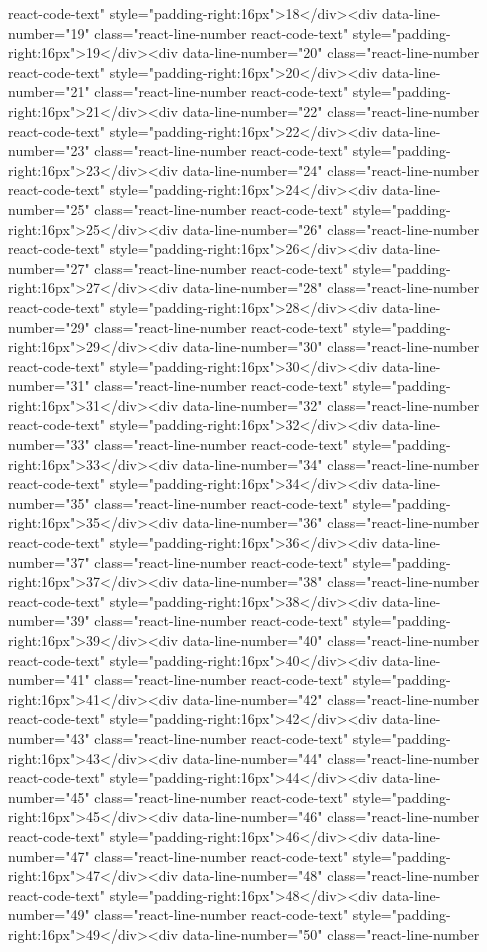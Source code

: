 {{{{{{{react-code-text" style="padding-right:16px">18</div><div data-line-number="19" class="react-line-number react-code-text" style="padding-right:16px">19</div><div data-line-number="20" class="react-line-number react-code-text" style="padding-right:16px">20</div><div data-line-number="21" class="react-line-number react-code-text" style="padding-right:16px">21</div><div data-line-number="22" class="react-line-number react-code-text" style="padding-right:16px">22</div><div data-line-number="23" class="react-line-number react-code-text" style="padding-right:16px">23</div><div data-line-number="24" class="react-line-number react-code-text" style="padding-right:16px">24</div><div data-line-number="25" class="react-line-number react-code-text" style="padding-right:16px">25</div><div data-line-number="26" class="react-line-number react-code-text" style="padding-right:16px">26</div><div data-line-number="27" class="react-line-number react-code-text" style="padding-right:16px">27</div><div data-line-number="28" class="react-line-number react-code-text" style="padding-right:16px">28</div><div data-line-number="29" class="react-line-number react-code-text" style="padding-right:16px">29</div><div data-line-number="30" class="react-line-number react-code-text" style="padding-right:16px">30</div><div data-line-number="31" class="react-line-number react-code-text" style="padding-right:16px">31</div><div data-line-number="32" class="react-line-number react-code-text" style="padding-right:16px">32</div><div data-line-number="33" class="react-line-number react-code-text" style="padding-right:16px">33</div><div data-line-number="34" class="react-line-number react-code-text" style="padding-right:16px">34</div><div data-line-number="35" class="react-line-number react-code-text" style="padding-right:16px">35</div><div data-line-number="36" class="react-line-number react-code-text" style="padding-right:16px">36</div><div data-line-number="37" class="react-line-number react-code-text" style="padding-right:16px">37</div><div data-line-number="38" class="react-line-number react-code-text" style="padding-right:16px">38</div><div data-line-number="39" class="react-line-number react-code-text" style="padding-right:16px">39</div><div data-line-number="40" class="react-line-number react-code-text" style="padding-right:16px">40</div><div data-line-number="41" class="react-line-number react-code-text" style="padding-right:16px">41</div><div data-line-number="42" class="react-line-number react-code-text" style="padding-right:16px">42</div><div data-line-number="43" class="react-line-number react-code-text" style="padding-right:16px">43</div><div data-line-number="44" class="react-line-number react-code-text" style="padding-right:16px">44</div><div data-line-number="45" class="react-line-number react-code-text" style="padding-right:16px">45</div><div data-line-number="46" class="react-line-number react-code-text" style="padding-right:16px">46</div><div data-line-number="47" class="react-line-number react-code-text" style="padding-right:16px">47</div><div data-line-number="48" class="react-line-number react-code-text" style="padding-right:16px">48</div><div data-line-number="49" class="react-line-number react-code-text" style="padding-right:16px">49</div><div data-line-number="50" class="react-line-number }}}}}}}
